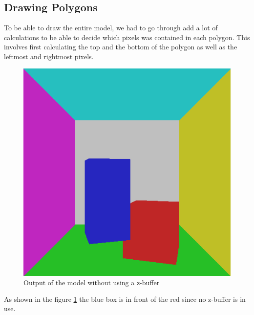 \documentclass[a4paper,11pt]{article}
\begin{document}
\subsection{Drawing Polygons}
To be able to draw the entire model, we had to go through add a lot of calculations to be able to decide which pixels was contained in each polygon. This involves first calculating the top and the bottom of the polygon as well as the leftmost and rightmost pixels.   

\begin{figure}[h!]
	\centering	
	\includegraphics[width=0.45\linewidth]{screenshot15.png}
	\caption{Output of the model without using a z-buffer}
	\label{fig15}
\end{figure}

As shown in the figure \ref{fig15} the blue box is in front of the red since no z-buffer is in use.
\end{document}
